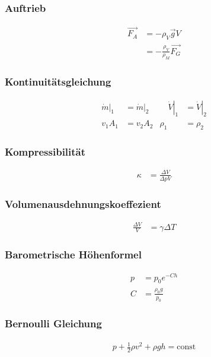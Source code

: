 \begin{multicols}{2}
\subsubsection*{Auftrieb}
\begin{align*}
\vec{F_A}&=-\rho_V \vec{g} V\\
&=-\frac{\rho_V}{\rho_M}\vec{F_G}
\end{align*}

\subsubsection*{Kontinuitätsgleichung}
\begin{alignat*}{2}
\left.\dot{m}\right|_1&=\left.\dot{m}\right|_2 & \quad \left.\dot{V}\right|_1&=\left.\dot{V}\right|_2\\
v_1A_1&=v_2A_2 & \rho_1&=\rho_2
\end{alignat*}
\end{multicols}

\begin{multicols}{2}{}
\subsubsection*{Kompressibilität}
\begin{align*}
\kappa&=\frac{\Delta V}{\Delta p V}
\end{align*}


\subsubsection*{Volumenausdehnungskoeffezient}
\begin{align*}
\frac{\Delta V}{V}&= \gamma \Delta T
\end{align*}


\subsubsection*{Barometrische Höhenformel}
\begin{align*}
p&=p_0 e^{-Ch}\\
C&=\frac{\rho_0 g}{p_0}
\end{align*}


\subsubsection*{Bernoulli Gleichung}
\begin{align*}
p+\frac{1}{2}\rho v^2+ \rho g h= \text{const}
\end{align*}
\end{multicols}


